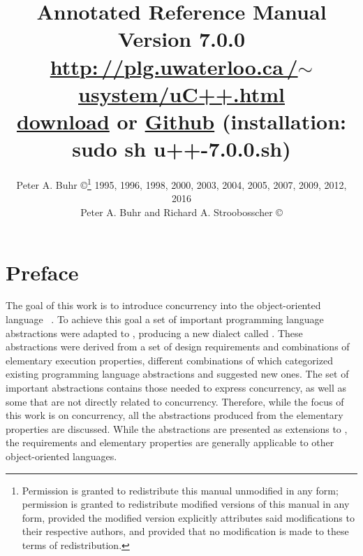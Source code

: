 \documentclass[openright,twoside]{report}
\newcommand{\Version}{7.0.0}
\begin{document}

\pagestyle{headings}

\title{\huge \bf
\uC Annotated Reference Manual \\
\vspace{1in}
\LARGE Version \Version \\
\vspace{1in}
\href{http://plg.uwaterloo.ca/~usystem/uC++.html}{\textsf{http:\,//\hspace{0.1ex}plg.uwaterloo.ca\,/$\sim$usystem/uC++.html}} \\
\vspace{0.125in}
\href{http://plg.uwaterloo.ca/~usystem/pub/uSystem/u++-7.0.0.sh}{\uC download} or \href{https://github.com/pabuhr/uCPP}{Github} (installation: \textsf{sudo sh u++-7.0.0.sh}) \\
} %
\author{
\large Peter A. Buhr \copyright\thanks{\normalsize
Permission is granted to redistribute this manual unmodified in any form;
permission is granted to redistribute modified versions of this	manual in any form, provided the modified version explicitly attributes said modifications to their respective authors, and provided that no modification is made to these terms of redistribution.
} 1995, 1996, 1998, 2000, 2003, 2004, 2005, 2007, 2009, 2012, 2016 \\
Peter A. Buhr and Richard A. Stroobosscher \copyright{} \\
} %

\maketitle
\thispagestyle{empty}				%
\cleardoublepage					%
\tableofcontents
\cleardoublepage					%


\chapter*{Preface}

The goal of this work is to introduce concurrency into the object-oriented language \CC~\cite{C++:V3}.
To achieve this goal a set of important programming language abstractions were adapted to \CC, producing a new dialect called \uC.
These abstractions were derived from a set of design requirements and combinations of elementary execution properties, different combinations of which categorized existing programming language abstractions and suggested new ones.
The set of important abstractions contains those needed to express concurrency, as well as some that are not directly related to concurrency.
Therefore, while the focus of this work is on concurrency, all the abstractions produced from the elementary properties are discussed.
While the abstractions are presented as extensions to \CC, the requirements and elementary properties are generally applicable to other object-oriented languages.
\end{document}
